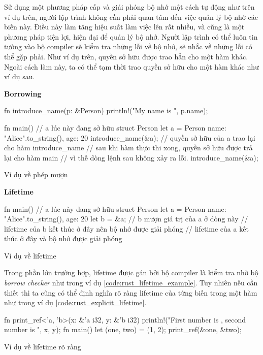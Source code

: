 Sử dụng một phương pháp cấp và giải phóng bộ nhớ một cách tự động như trên ví dụ trên, người lập trình không cần phải quan tâm đến việc quản lý bộ nhớ các biến này.
Điều này làm tăng hiệu suất làm việc lên rất nhiều, và cũng là một phương pháp tiện lợi, hiện đại để quản lý bộ nhớ.
Người lập trình có thể luôn tin tưởng vào bộ compiler sẽ kiểm tra những lỗi về bộ nhớ, sẽ nhắc về những lỗi có thể gặp phải.
Như ví dụ trên, quyền sở hữu được trao hẳn cho một hàm khác.
Ngoài cách làm này, ta có thể tạm thời trao quyền sở hữu cho một hàm khác như ví dụ sau.

\textbf{Borrowing}
\begin{listing}[H]
\begin{rustcode}
fn introduce_name(p: &Person) {
  println!("My name is {}", p.name);
}

fn main() {
  // a lúc này đang sở hữu struct Person
  let a = Person{ name: "Alice".to_string(), age: 20 }
  introduce_name(&a); // quyền sở hữu của a trao lại cho hàm introduce_name
  // sau khi hàm thực thi xong, quyền sở hữu được trả lại cho hàm main
  // vì thế dòng lệnh sau không xảy ra lỗi.
  introduce_name(&a);
}
\end{rustcode}
\caption{Ví dụ về phép mượn}
\label{code:rust_borrowing_example}
\end{listing}

\pagebreak
\textbf{Lifetime}
\begin{listing}[H]
\begin{rustcode}
fn main() {
  // a lúc này đang sở hữu struct Person
  let a = Person{ name: "Alice".to_string(), age: 20 }
  {
    let b = &a; // b mượn giá trị của a ở dòng này
  } // lifetime của b kết thúc ở đây nên bộ nhớ được giải phóng
} // lifetime của a kết thúc ở đây và bộ nhớ được giải phóng
\end{rustcode}
\caption{Ví dụ về lifetime}
\label{code:rust_lifetime_example}
\end{listing}

Trong phần lớn trường hợp, lifetime được gán bởi bộ compiler là kiểm tra nhờ bộ \emph{borrow checker} như trong ví dụ \ref{code:rust_lifetime_example}.
Tuy nhiên nếu cần thiết thì ta cũng có thể định nghĩa rõ ràng lifetime của từng biến trong một hàm như trong ví dụ \ref{code:rust_explicit_lifetime}.
\begin{listing}[H]
\begin{rustcode}
fn print_ref<'a, 'b>(x: &'a i32, y: &'b i32) {
    println!("First number is {}, second number is {}", x, y);
}
fn main() {
  let (one, two) = (1, 2);
  print_ref(&one, &two);
}
\end{rustcode}
\caption{Ví dụ về lifetime rõ ràng}
\label{code:rust_explicit_lifetime}
\end{listing}

